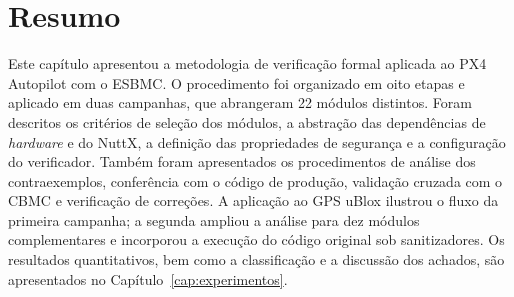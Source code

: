 \section{Resumo}
\label{sec:resumo-metodologia}

Este capítulo apresentou a metodologia de verificação formal aplicada ao PX4 Autopilot com o ESBMC. O procedimento foi organizado em oito etapas e aplicado em duas campanhas, que abrangeram 22 módulos distintos. Foram descritos os critérios de seleção dos módulos, a abstração das dependências de \textit{hardware} e do NuttX, a definição das propriedades de segurança e a configuração do verificador. Também foram apresentados os procedimentos de análise dos contraexemplos, conferência com o código de produção, validação cruzada com o CBMC e verificação de correções. A aplicação ao GPS uBlox ilustrou o fluxo da primeira campanha; a segunda ampliou a análise para dez módulos complementares e incorporou a execução do código original sob sanitizadores. Os resultados quantitativos, bem como a classificação e a discussão dos achados, são apresentados no Capítulo~\ref{cap:experimentos}.